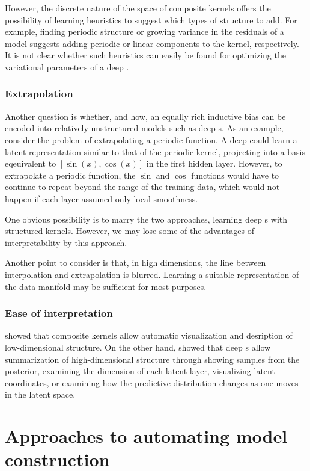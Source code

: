 However, the discrete nature of the space of composite kernels offers the possibility of learning heuristics to suggest which types of structure to add.
For example, finding periodic structure or growing variance in the residuals of a model suggests adding periodic or linear components to the kernel, respectively.
It is not clear whether such heuristics can easily be found for optimizing the variational parameters of a deep \gp{}.

\subsubsection{Extrapolation}
Another question is whether, and how, an equally rich inductive bias can be encoded into relatively unstructured models such as deep \gp{}s.
As an example, consider the problem of extrapolating a periodic function.
A deep \gp{} could learn a latent representation similar to that of the periodic kernel, projecting into a basis eqeuivalent to $[\sin(x), \cos(x)]$ in the first hidden layer.
However, to extrapolate a periodic function, the $\sin$ and $\cos$ functions would have to continue to repeat beyond the range of the training data, which would not happen if each layer assumed only local smoothness.

One obvious possibility is to marry the two approaches, learning deep \gp{}s with structured kernels.
However, we may lose some of the advantages of interpretability by this approach.

Another point to consider is that, in high dimensions, the line between interpolation and extrapolation is blurred.
Learning a suitable representation of the data manifold may be sufficient for most purposes.

\subsubsection{Ease of interpretation}
 showed that composite kernels allow automatic visualization and desription of low-dimensional structure.
On the other hand, \citet{damianou2012deep} showed that deep \gplvm{}s allow summarization of high-dimensional structure through showing samples from the posterior, examining the dimension of each latent layer, visualizing latent coordinates, or examining how the predictive distribution changes as one moves in the latent space.




\section{Approaches to automating model construction}

